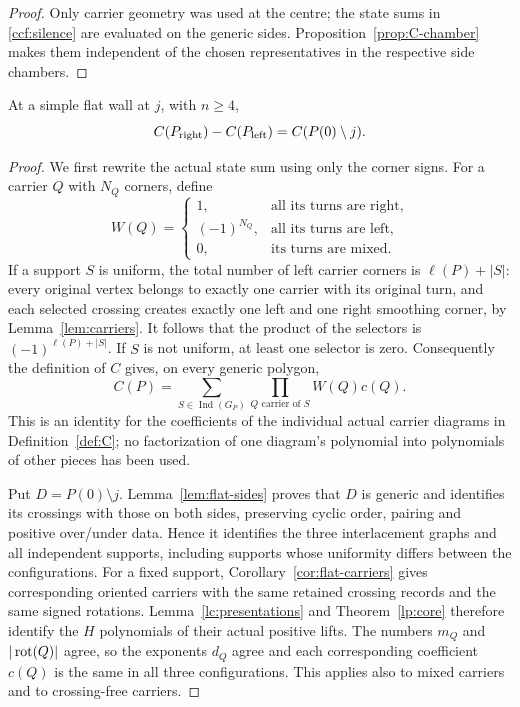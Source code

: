 \begin{proof}
Only carrier geometry was used at the centre; the state sums in
\eqref{ccf:silence} are evaluated on the generic sides.
Proposition~\ref{prop:C-chamber} makes them independent of the chosen
representatives in the respective side chambers.
\end{proof}

\begin{theorem}\label{thm:C-S3}
At a simple flat wall at $j$, with $n\geq4$,
\begin{equation}\label{ccf:flat-law}
C(P_{\rm right})-C(P_{\rm left})=C(P(0)\setminus j).
\end{equation}
\end{theorem}
\begin{proof}
We first rewrite the actual state sum using only the corner signs.
For a carrier $Q$ with $N_Q$ corners, define
\begin{equation}\label{ccf:selector}
W(Q)=
\begin{cases}
1,&\text{all its turns are right},\\
(-1)^{N_Q},&\text{all its turns are left},\\
0,&\text{its turns are mixed}.
\end{cases}
\end{equation}
If a support $S$ is uniform, the total number of left carrier corners is
$\ell(P)+|S|$: every original vertex belongs to exactly one carrier with
its original turn, and each selected crossing creates exactly one left
and one right smoothing corner, by Lemma~\ref{lem:carriers}. It follows
that the product of the selectors is $(-1)^{\ell(P)+|S|}$. If $S$ is
not uniform, at least one selector is zero. Consequently the definition
of $C$ gives, on every generic polygon,
\begin{equation}\label{ccf:selector-sum}
C(P)=\sum_{S\in\operatorname{Ind}(G_P)}
       \prod_{Q\text{ carrier of }S}W(Q)c(Q).
\end{equation}
This is an identity for the coefficients of the individual actual carrier
diagrams in Definition~\ref{def:C}; no factorization of one diagram's
polynomial into polynomials of other pieces has been used.

Put $D=P(0)\setminus j$. Lemma~\ref{lem:flat-sides} proves that $D$
is generic and identifies its crossings with those on both sides,
preserving cyclic order, pairing and positive over/under data. Hence it
identifies the three interlacement graphs and all independent supports,
including supports whose uniformity differs between the configurations.
For a fixed support, Corollary~\ref{cor:flat-carriers} gives corresponding
oriented carriers with the same retained crossing records and the same
signed rotations. Lemma~\ref{lc:presentations} and
Theorem~\ref{lp:core} therefore identify the $H$ polynomials of their
actual positive lifts. The numbers $m_Q$ and
$|\operatorname{rot}(Q)|$ agree, so the exponents $d_Q$ agree and each corresponding
coefficient $c(Q)$ is the same in all three configurations. This applies
also to mixed carriers and to crossing-free carriers.


\end{proof}
